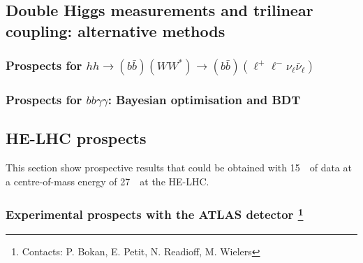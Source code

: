 \documentclass[../report.tex]{subfiles}
\providecommand{\main}{..}
\begin{document}


\subsection{Double Higgs measurements and trilinear coupling: alternative methods}
\label{sec:HH_meas_th}

\subsubsection{Prospects for $hh \to (b \bar b)(WW^*) \to (b \bar b)( \ell^+\ell^- \nu_\ell \bar\nu_\ell)$}





\subsubsection{Prospects for $bb\gamma\gamma $: Bayesian optimisation and BDT}












\subsection{HE-LHC prospects}
\label{sec:HH_HE}

This section show prospective results that could be obtained with 15~\abinv\ of data at a centre-of-mass energy of 27~\TeV\ at the HE-LHC.



\subsubsection{Experimental prospects with the ATLAS detector
\footnote{Contacts: P. Bokan, E. Petit, N. Readioff, M. Wielers}}

\end{document}
